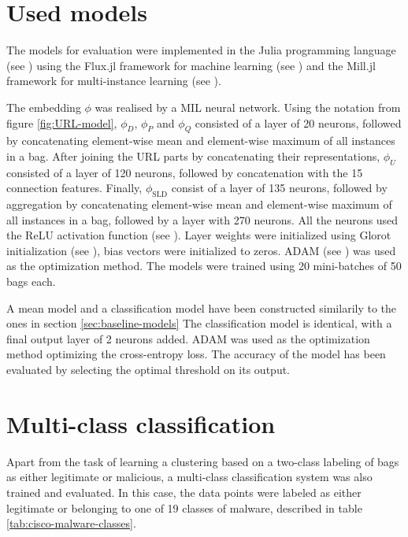 \section{Used models}

The models for evaluation were implemented in the Julia programming language (see \cite{bezanson_julia:_2017}) using the Flux.jl framework for machine learning (see \cite{innes_flux:_2018}) and the Mill.jl framework for multi-instance learning (see \cite{pevny_milljl_2019}).

The embedding \( \phi \) was realised by a MIL neural network. Using the notation from figure \ref{fig:URL-model}, \( \phi_D \), \( \phi_P \) and \( \phi_Q \) consisted of a layer of 20 neurons, followed by concatenating element-wise mean and element-wise maximum of all instances in a bag. After joining the URL parts by concatenating their representations, \( \phi_U \) consisted of a layer of 120 neurons, followed by concatenation with the 15 connection features. Finally, \( \phi_\mathrm{SLD} \) consist of a layer of 135 neurons, followed by aggregation by concatenating element-wise mean and element-wise maximum of all instances in a bag, followed by a layer with 270 neurons. All the neurons used the ReLU activation function (see \cite{hahnloser_digital_2000}). Layer weights were initialized using Glorot initialization (see \cite{glorot_understanding_2010}), bias vectors were initialized to zeros. ADAM (see \cite{kingma_adam:_2014}) was used as the optimization method. The models were trained using 20 mini-batches of 50 bags each.

A mean model and a classification model have been constructed similarily to the ones in section \ref{sec:baseline-models}
The classification model is identical, with a final output layer of 2 neurons added. ADAM was used as the optimization method optimizing the cross-entropy loss. The accuracy of the model has been evaluated by selecting the optimal threshold on its output.

\section{Multi-class classification}
Apart from the task of learning a clustering based on a two-class labeling of bags as either legitimate or malicious, a multi-class classification system was also trained and evaluated. In this case, the data points were labeled as either legitimate or belonging to one of 19 classes of malware, described in table \ref{tab:cisco-malware-classes}.

